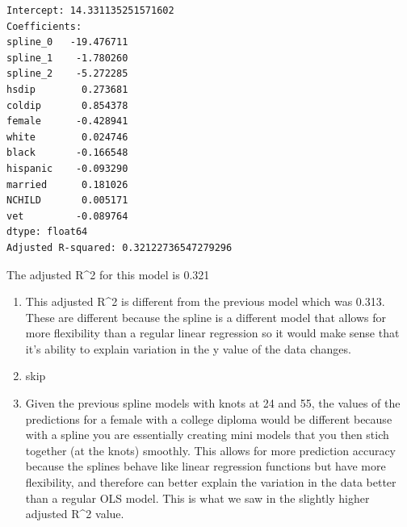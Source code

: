 \documentclass[
  letterpaper,
  DIV=11,
  numbers=noendperiod]{scrartcl}
\begin{document}
\begin{verbatim}
Intercept: 14.331135251571602
Coefficients:
spline_0   -19.476711
spline_1    -1.780260
spline_2    -5.272285
hsdip        0.273681
coldip       0.854378
female      -0.428941
white        0.024746
black       -0.166548
hispanic    -0.093290
married      0.181026
NCHILD       0.005171
vet         -0.089764
dtype: float64
Adjusted R-squared: 0.32122736547279296
\end{verbatim}

The adjusted R\^{}2 for this model is 0.321

\begin{enumerate}
\def\labelenumi{\alph{enumi}.}
\setcounter{enumi}{1}
\item
  This adjusted R\^{}2 is different from the previous model which was
  0.313. These are different because the spline is a different model
  that allows for more flexibility than a regular linear regression so
  it would make sense that it's ability to explain variation in the y
  value of the data changes.
\item
  skip
\item
  Given the previous spline models with knots at 24 and 55, the values
  of the predictions for a female with a college diploma would be
  different because with a spline you are essentially creating mini
  models that you then stich together (at the knots) smoothly. This
  allows for more prediction accuracy because the splines behave like
  linear regression functions but have more flexibility, and therefore
  can better explain the variation in the data better than a regular OLS
  model. This is what we saw in the slightly higher adjusted R\^{}2
  value.
\end{enumerate}
\end{document}
